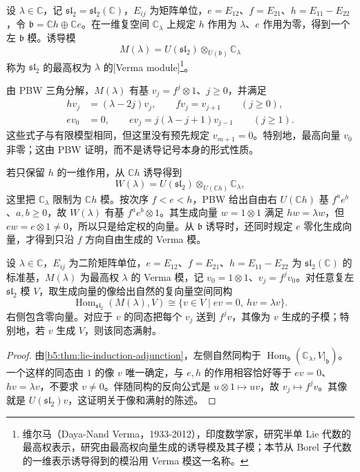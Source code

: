\begin{definition}\label{b5:def:sl2-verma}
	设 \(\lambda\in\mathbb C\)，记 \(\mathfrak{sl}_2=\mathfrak{sl}_2(\mathbb C)\)，\(E_{ij}\) 为矩阵单位，\(e=E_{12}\)、\(f=E_{21}\)、\(h=E_{11}-E_{22}\)，令 \(\mathfrak b=\mathbb Ch\oplus\mathbb Ce\)。在一维复空间 \(\mathbb C_\lambda\) 上规定 \(h\) 作用为 \(\lambda\)、\(e\) 作用为零，得到一个左 \(\mathfrak b\) 模。诱导模
	\[
		M(\lambda)=U(\mathfrak{sl}_2)\otimes_{U(\mathfrak b)}\mathbb C_\lambda
	\]
	称为 \(\mathfrak{sl}_2\) 的最高权为 \(\lambda\) 的[Verma module]\footnote{维尔马（Daya-Nand Verma，1933-2012），印度数学家，研究半单 Lie 代数的最高权表示，研究由最高权向量生成的诱导模及其子模；本节从 Borel 子代数的一维表示诱导得到的模沿用 Verma 模这一名称。}。
\end{definition}
由 PBW 三角分解，\(M(\lambda)\) 有基 \(v_j=f^j\otimes1\)、\(j\ge0\)，并满足
\[
	\begin{aligned}
		hv_j&=(\lambda-2j)v_j,\qquad fv_j=v_{j+1}\qquad(j\ge0),\\
		ev_0&=0,\qquad ev_j=j(\lambda-j+1)v_{j-1}\qquad(j\ge1).
	\end{aligned}
\]
这些式子与有限模型相同，但这里没有预先规定 \(v_{m+1}=0\)。特别地，最高向量 \(v_0\) 非零；这由 PBW 证明，而不是诱导记号本身的形式性质。

\ProseParagraphBreak

若只保留 \(h\) 的一维作用，从 \(\mathbb Ch\) 诱导得到
\[
	W(\lambda)=U(\mathfrak{sl}_2)\otimes_{U(\mathbb Ch)}\mathbb C_\lambda,
\]
这里把 \(\mathbb C_\lambda\) 限制为 \(\mathbb Ch\) 模。按次序 \(f<e<h\)，PBW 给出自由右 \(U(\mathbb Ch)\) 基 \(f^ae^b\)、\(a,b\ge0\)，故 \(W(\lambda)\) 有基 \(f^ae^b\otimes1\)。其生成向量 \(w=1\otimes1\) 满足 \(hw=\lambda w\)，但 \(ew=e\otimes1\ne0\)，所以只是给定权的向量。从 \(\mathfrak b\) 诱导时，还同时规定 \(e\) 零化生成向量，才得到只沿 \(f\) 方向自由生成的 Verma 模。

\begin{corollary}\label{b5:cor:sl2-verma-universal}
	设 \(\lambda\in\mathbb C\)，\(E_{ij}\) 为二阶矩阵单位，\(e=E_{12}\)、\(f=E_{21}\)、\(h=E_{11}-E_{22}\) 为 \(\mathfrak{sl}_2(\mathbb C)\) 的标准基，\(M(\lambda)\) 为最高权 \(\lambda\) 的 Verma 模，记 \(v_0=1\otimes1\)、\(v_j=f^jv_0\)。对任意复左 \(\mathfrak{sl}_2\) 模 \(V\)，取生成向量的像给出自然的复向量空间同构
	\[
		\operatorname{Hom}_{\mathfrak{sl}_2}(M(\lambda),V) \cong\{v\in V\mid ev=0,\ hv=\lambda v\}.
	\]
	右侧包含零向量。对应于 \(v\) 的同态把每个 \(v_j\) 送到 \(f^jv\)，其像为 \(v\) 生成的子模；特别地，若 \(v\) 生成 \(V\)，则该同态满射。
\end{corollary}
\begin{proof}
	由\cref{b5:thm:lie-induction-adjunction}，左侧自然同构于 \(\operatorname{Hom}_{\mathfrak b}(\mathbb C_\lambda,V|_{\mathfrak b})\)。一个这样的同态由 \(1\) 的像 \(v\) 唯一确定，与 \(e,h\) 的作用相容恰好等于 \(ev=0\)、\(hv=\lambda v\)，不要求 \(v\ne0\)。伴随同构的反向公式是 \(u\otimes1\mapsto uv\)，故 \(v_j\mapsto f^jv\)。其像就是 \(U(\mathfrak{sl}_2)v\)，这证明关于像和满射的陈述。
\end{proof}

